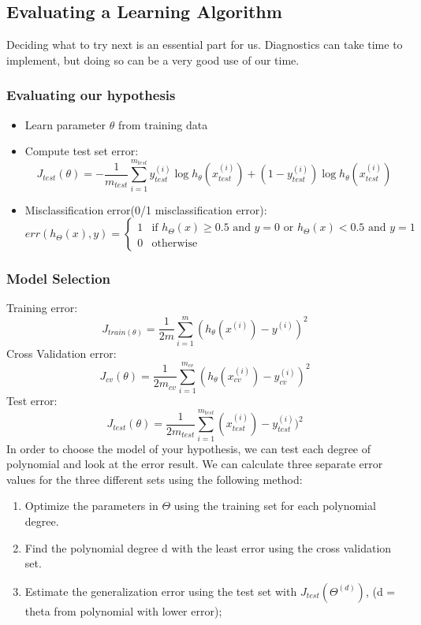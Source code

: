 \documentclass{article}
\begin{document}
\subsection{Evaluating a Learning Algorithm}
Deciding what to try next is an essential part for us. Diagnostics can take time to implement, but doing so can be a very good use of our time.

\subsubsection{Evaluating our hypothesis}
\begin{itemize}
  \item Learn parameter $\theta$ from training data
  \item Compute test set error:
  \[J_{test}(\theta) = -\frac{1}{m_{test}}\sum_{i=1}^{m_{test}}y_{test}^{(i)}\log h_{\theta}(x_{test}^{(i)})+(1-y_{test}^{(i)})\log h_{\theta}(x_{test}^{(i)})\]
  \item Misclassification error(0/1 misclassification error):
\[err(h_{\Theta}(x),y) = \begin{cases}
1 & \text{if $h_{\Theta}(x) \geq 0.5$ and $y = 0$ or $h_{\Theta}(x) < 0.5$ and $y = 1$}\\
0 & \text{otherwise}
\end{cases}\]
\end{itemize}

\subsubsection{Model Selection}
Training error:
\[J_{train(\theta)} = \frac{1}{2m}\sum_{i=1}^m(h_{\theta}(x^{(i)}) - y^{(i)})^2\]
Cross Validation error:
\[J_{cv}(\theta) = \frac{1}{2m_{cv}}\sum_{i=1}^{m_{cv}}(h_{\theta}(x_{cv}^{(i)})-y_{cv}^{(i)})^2\]
Test error:
\[J_{test}(\theta) = \frac{1}{2m_{test}}\sum_{i=1}^{m_{test}}(x_{test}^{(i)})-y_{test}^{(i)})^2\]
In order to choose the model of your hypothesis, we can test each degree of polynomial and look at the error result. We can calculate three separate error values for the three different sets using the following method:
\begin{enumerate}
  \item Optimize the parameters in $\Theta$ using the training set for each polynomial degree.
  \item Find the polynomial degree d with the least error using the cross validation set.
  \item Estimate the generalization error using the test set with $J_{test}(\Theta^{(d)})$, (d = theta from polynomial with lower error);
\end{enumerate}
\end{document}
